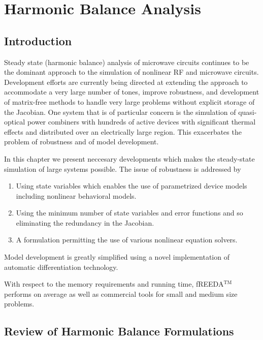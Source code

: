 
\chapter{Harmonic Balance Analysis} \label{ch_svhb}

\section{Introduction}

Steady state (harmonic balance) analysis of microwave circuits
continues to be the dominant approach to the simulation of nonlinear
RF and microwave circuits. Development efforts are currently being
directed at extending the approach to accommodate a very large number
of tones, improve robustness, and development of matrix-free methods
to handle very large problems without explicit storage of the
Jacobian. One system that is of particular concern is the simulation
of quasi-optical power combiners with hundreds of active devices with
significant thermal effects and distributed over an electrically large
region. This exacerbates the problem of robustness and of model
development.

In this chapter we present neccesary developments which makes the
steady-state simulation of large systems possible. The issue of
robustness is addressed by
\begin{enumerate}
\item Using state variables which enables the use of parametrized
device models including nonlinear behavioral models.
\item Using the minimum number of state variables and error
functions and so eliminating the redundancy in the Jacobian.
\item A formulation permitting the use of various nonlinear equation
solvers.
\end{enumerate}
Model development is greatly simplified using a novel implementation
of automatic differentiation technology.

With respect to the memory requirements and running time, fREEDA$^{\mathrm{TM}}$
performs on average as well as commercial tools for small and medium
size problems.

\section{Review of Harmonic Balance Formulations}

